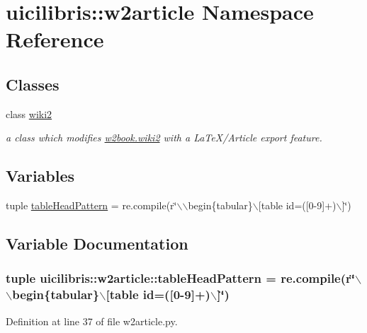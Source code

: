 \hypertarget{namespaceuicilibris_1_1w2article}{\section{uicilibris\-:\-:w2article \-Namespace \-Reference}
\label{namespaceuicilibris_1_1w2article}
}
\subsection*{\-Classes}
\begin{DoxyCompactItemize}
\item 
class \hyperlink{classuicilibris_1_1w2article_1_1wiki2}{wiki2}
\begin{DoxyCompactList}\small\item\em a class which modifies \hyperlink{classuicilibris_1_1w2book_1_1wiki2}{w2book.\-wiki2} with a \-La\-Te\-X/\-Article export feature. \end{DoxyCompactList}\end{DoxyCompactItemize}
\subsection*{\-Variables}
\begin{DoxyCompactItemize}
\item 
tuple \hyperlink{namespaceuicilibris_1_1w2article_a561ac3e9800f8f33a44fdad7128f170d}{table\-Head\-Pattern} = re.\-compile(r\char`\"{}$\backslash$$\backslash$begin\{tabular\}$\backslash$\mbox{[}table id=(\mbox{[}0-\/9\mbox{]}+)$\backslash$\mbox{]}\char`\"{})
\end{DoxyCompactItemize}


\subsection{\-Variable \-Documentation}
\hypertarget{namespaceuicilibris_1_1w2article_a561ac3e9800f8f33a44fdad7128f170d}{
\subsubsection[{table\-Head\-Pattern}]{\setlength{\rightskip}{0pt plus 5cm}tuple {\bf uicilibris\-::w2article\-::table\-Head\-Pattern} = re.\-compile(r\char`\"{}$\backslash$$\backslash$begin\{tabular\}$\backslash$\mbox{[}table id=(\mbox{[}0-\/9\mbox{]}+)$\backslash$\mbox{]}\char`\"{})}}\label{namespaceuicilibris_1_1w2article_a561ac3e9800f8f33a44fdad7128f170d}


\-Definition at line 37 of file w2article.\-py.

